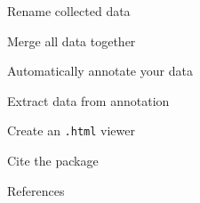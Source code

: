 \documentclass[13pt, t]{beamer}
\begin{document}
\begin{frame}{Rename collected data}

\end{frame}

\begin{frame}{Merge all data together}

\end{frame}

\begin{frame}{Automatically annotate your data}

\end{frame}

\begin{frame}{Extract data from annotation}

\end{frame}

\begin{frame}{Create an \texttt{.html} viewer}

\end{frame}

\begin{frame}{Cite the package}

\end{frame}


\begin{frame}{References}
\footnotesize


\end{frame}
\end{document}
